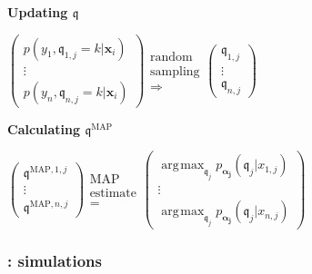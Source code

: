 \documentclass[english,xcolor={rgb,dvipsnames,table,usenames}, presentation]{beamer}
\DeclareMathOperator*{\argmax}{\arg\!\max}
\newcommand{\bqk}{\bm{\mathfrak{q}}}
\begin{document}
\begin{frame}
\medskip

\textbf{Updating $\bqk$}

\medskip

$\left( \begin{array}{c}
p(y_1,\bqk_{1,j}=k|\bm{x}_i)  \\
\vdots \\
p(y_n,\bqk_{n,j}=k|\bm{x}_i) \end{array} \right)
\begin{array}{c}
\text{random} \\
\text{sampling} \\
\Rightarrow \end{array}
\left( \begin{array}{ccc}
\bqk_{1,j}  \\
 \vdots \\
 \bqk_{n,j} \end{array} \right)$

\medskip

\textbf{Calculating $\bqk^{\text{MAP}}$}

\medskip

$\left( \begin{array}{c}
\bqk^{\text{MAP},1,j}  \\
\vdots \\
\bqk^{\text{MAP},n,j} \end{array} \right)
\begin{array}{c}
\text{MAP} \\
\text{estimate} \\
= \end{array}
\left( \begin{array}{ccc}
\argmax_{\bqk_j} p_{\bm{\alpha_j}}(\bqk_j | x_{1,j})  \\
 \vdots \\
\argmax_{\bqk_j} p_{\bm{\alpha_j}}(\bqk_j | x_{n,j}) \end{array} \right)$
 
 
\normalsize

\end{frame}






\begin{frame}
\frametitle{\secname : simulations}



\end{frame}
\end{document}
